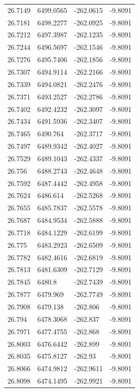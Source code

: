 \begin{table}[H]
\begin{tabular}{llll}
26.7149 & 6499.0565 & -262.0615 & -9.8091 \\
26.7181 & 6498.2277 & -262.0925 & -9.8091 \\
26.7212 & 6497.3987 & -262.1235 & -9.8091 \\
26.7244 & 6496.5697 & -262.1546 & -9.8091 \\
26.7276 & 6495.7406 & -262.1856 & -9.8091 \\
26.7307 & 6494.9114 & -262.2166 & -9.8091 \\
26.7339 & 6494.0821 & -262.2476 & -9.8091 \\
26.7371 & 6493.2527 & -262.2786 & -9.8091 \\
26.7402 & 6492.4232 & -262.3097 & -9.8091 \\
26.7434 & 6491.5936 & -262.3407 & -9.8091 \\
26.7465 & 6490.764 & -262.3717 & -9.8091 \\
26.7497 & 6489.9342 & -262.4027 & -9.8091 \\
26.7529 & 6489.1043 & -262.4337 & -9.8091 \\
26.756 & 6488.2743 & -262.4648 & -9.8091 \\
26.7592 & 6487.4442 & -262.4958 & -9.8091 \\
26.7624 & 6486.614 & -262.5268 & -9.8091 \\
26.7655 & 6485.7837 & -262.5578 & -9.8091 \\
26.7687 & 6484.9534 & -262.5888 & -9.8091 \\
26.7718 & 6484.1229 & -262.6199 & -9.8091 \\
26.775 & 6483.2923 & -262.6509 & -9.8091 \\
26.7782 & 6482.4616 & -262.6819 & -9.8091 \\
26.7813 & 6481.6309 & -262.7129 & -9.8091 \\
26.7845 & 6480.8 & -262.7439 & -9.8091 \\
26.7877 & 6479.969 & -262.7749 & -9.8091 \\
26.7908 & 6479.138 & -262.806 & -9.8091 \\
26.794 & 6478.3068 & -262.837 & -9.8091 \\
26.7971 & 6477.4755 & -262.868 & -9.8091 \\
26.8003 & 6476.6442 & -262.899 & -9.8091 \\
26.8035 & 6475.8127 & -262.93 & -9.8091 \\
26.8066 & 6474.9812 & -262.9611 & -9.8091 \\
26.8098 & 6474.1495 & -262.9921 & -9.8091 \\

\end{tabular}
\end{table}

